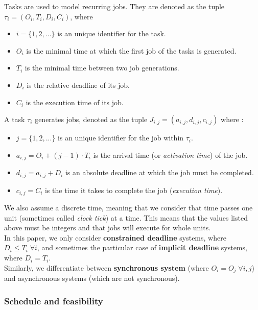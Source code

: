 \documentclass[a4paper,10pt]{article}
\begin{document}
        Tasks are used to model recurring jobs. They are denoted as the tuple $\tau_i = (O_i, T_i, D_i, C_i)$, where
        \begin{itemize}
            \item $i = \{1,2,...\}$ is an unique identifier for the task.
            \item $O_i$ is the minimal time at which the first job of the tasks is generated.
            \item $T_i$ is the minimal time between two job generations.
            \item $D_i$ is the relative deadline of its job.
            \item $C_i$ is the execution time of its job.
        \end{itemize}

        A task $\tau_i$ generates jobs, denoted as the tuple $J_{i,j} = (a_{i, j}, d_{i,j}, c_{i,j})$ where :
        \begin{itemize}
            \item $j = \{1,2,...\}$ is an unique identifier for the job within $\tau_i$.
            \item $a_{i,j} = O_i + (j-1) \cdot T_i$ is the arrival time (or \emph{activation time}) of the job.
            \item $d_{i,j} = a_{i,j} + D_i$ is an absolute deadline at which the job must be completed.
            \item $c_{i,j} = C_i$ is the time it takes to complete the job (\emph{execution time}).
        \end{itemize}

        We also assume a discrete time, meaning that we consider that time passes one unit (sometimes called \emph{clock tick}) at a time. This means that the values listed above must be integers and that jobs will execute for whole units.\\

        In this paper, we only consider \textbf{constrained deadline} systems, where $D_i \leqslant T_i \; \forall i$, and sometimes the particular case of \textbf{implicit deadline} systems, where $D_i = T_i$.\\

        Similarly, we differentiate between \textbf{synchronous system} (where $O_i = O_j \; \forall i,j$) and asynchronous systems (which are not synchronous).

        \subsubsection{Schedule and feasibility}
\end{document}
